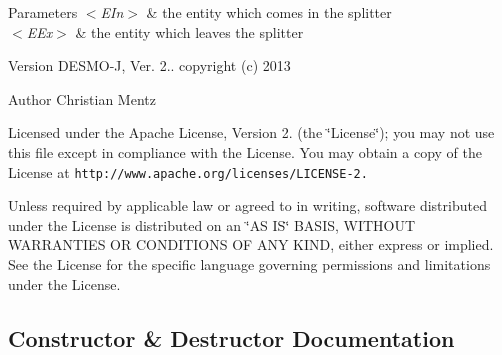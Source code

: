 \begin{DoxyParams}{Parameters}
{\em $<$\-E\-In$>$} & the entity which comes in the splitter \\
\hline
{\em $<$\-E\-Ex$>$} & the entity which leaves the splitter\\
\hline
\end{DoxyParams}
\begin{DoxyVersion}{Version}
D\-E\-S\-M\-O-\/\-J, Ver. 2.. copyright (c) 2013 
\end{DoxyVersion}
\begin{DoxyAuthor}{Author}
Christian Mentz
\end{DoxyAuthor}
Licensed under the Apache License, Version 2. (the \char`\"{}\-License\char`\"{}); you may not use this file except in compliance with the License. You may obtain a copy of the License at {\tt http\-://www.\-apache.\-org/licenses/\-L\-I\-C\-E\-N\-S\-E-\/2.}

Unless required by applicable law or agreed to in writing, software distributed under the License is distributed on an \char`\"{}\-A\-S I\-S\char`\"{} B\-A\-S\-I\-S, W\-I\-T\-H\-O\-U\-T W\-A\-R\-R\-A\-N\-T\-I\-E\-S O\-R C\-O\-N\-D\-I\-T\-I\-O\-N\-S O\-F A\-N\-Y K\-I\-N\-D, either express or implied. See the License for the specific language governing permissions and limitations under the License. 

\subsection{Constructor \& Destructor Documentation}
